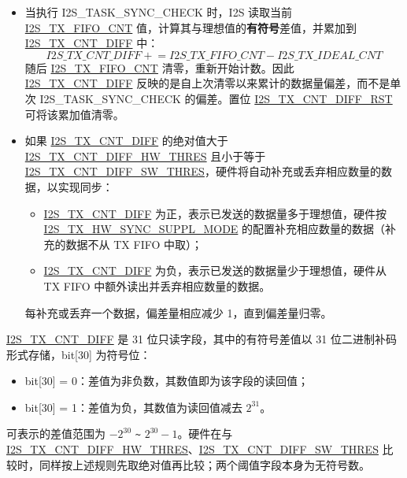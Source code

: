 \documentclass[main\_\_CN.tex]{subfiles}
\begin{document}
\begin{itemize}
    \item 当执行 I2S\_TASK\_SYNC\_CHECK 时，I2S 读取当前 \hyperref[fielddesc:I2STXFIFOCNT]{I2S\_TX\_FIFO\_CNT} 值，计算其与理想值的\textbf{有符号}差值，并累加到 \hyperref[fielddesc:I2STXCNTDIFF]{I2S\_TX\_CNT\_DIFF} 中：
    \[
        \hyperref[fielddesc:I2STXCNTDIFF]{I2S\_TX\_CNT\_DIFF} \mathrel{+}= \hyperref[fielddesc:I2STXFIFOCNT]{I2S\_TX\_FIFO\_CNT} - \hyperref[fielddesc:I2STXIDEALCNT]{I2S\_TX\_IDEAL\_CNT}
    \]
    随后 \hyperref[fielddesc:I2STXFIFOCNT]{I2S\_TX\_FIFO\_CNT} 清零，重新开始计数。因此 \hyperref[fielddesc:I2STXCNTDIFF]{I2S\_TX\_CNT\_DIFF} 反映的是自上次清零以来累计的数据量偏差，而不是单次 I2S\_TASK\_SYNC\_CHECK 的偏差。置位 \hyperref[fielddesc:I2STXCNTDIFFRST]{I2S\_TX\_CNT\_DIFF\_RST} 可将该累加值清零。
    \item 如果 \hyperref[fielddesc:I2STXCNTDIFF]{I2S\_TX\_CNT\_DIFF} 的绝对值大于 \hyperref[fielddesc:I2STXCNTDIFFHWTHRES]{I2S\_TX\_CNT\_DIFF\_HW\_THRES} 且小于等于 \hyperref[fielddesc:I2STXCNTDIFFSWTHRES]{I2S\_TX\_CNT\_DIFF\_SW\_THRES}，硬件将自动补充或丢弃相应数量的数据，以实现同步：
    \begin{itemize}
        \item \hyperref[fielddesc:I2STXCNTDIFF]{I2S\_TX\_CNT\_DIFF} 为正，表示已发送的数据量多于理想值，硬件按 \hyperref[fielddesc:I2STXHWSYNCSUPPLMODE]{I2S\_TX\_HW\_SYNC\_SUPPL\_MODE} 的配置补充相应数量的数据（补充的数据不从 TX FIFO 中取）；
        \item \hyperref[fielddesc:I2STXCNTDIFF]{I2S\_TX\_CNT\_DIFF} 为负，表示已发送的数据量少于理想值，硬件从 TX FIFO 中额外读出并丢弃相应数量的数据。
    \end{itemize}
    每补充或丢弃一个数据，偏差量相应减少 1，直到偏差量归零。
\end{itemize}

\begin{tiplisting}
\hyperref[fielddesc:I2STXCNTDIFF]{I2S\_TX\_CNT\_DIFF} 是 31 位只读字段，其中的有符号差值以 31 位二进制补码形式存储，bit[30] 为符号位：
\begin{itemize}
    \item bit[30] = 0：差值为非负数，其数值即为该字段的读回值；
    \item bit[30] = 1：差值为负，其数值为读回值减去 $2^{31}$。
\end{itemize}
可表示的差值范围为 $-2^{30}$ \verb+~+ $2^{30}-1$。硬件在与 \hyperref[fielddesc:I2STXCNTDIFFHWTHRES]{I2S\_TX\_CNT\_DIFF\_HW\_THRES}、\hyperref[fielddesc:I2STXCNTDIFFSWTHRES]{I2S\_TX\_CNT\_DIFF\_SW\_THRES} 比较时，同样按上述规则先取绝对值再比较；两个阈值字段本身为无符号数。
\end{tiplisting}
\end{document}
